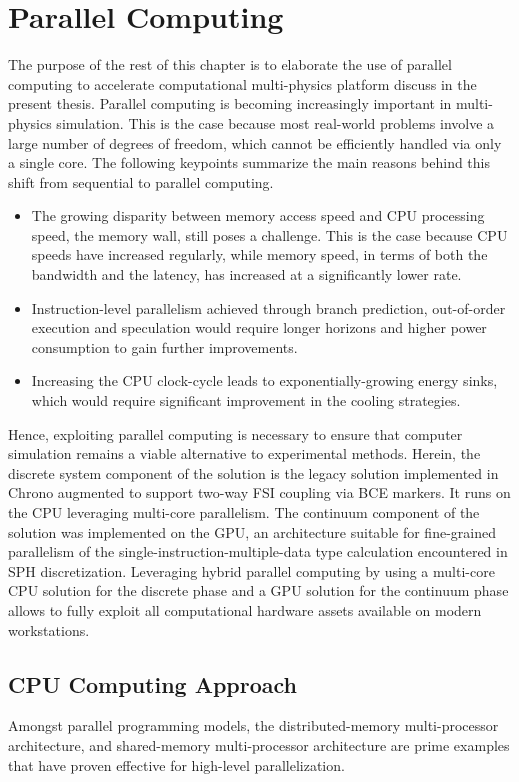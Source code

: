 \section{Parallel Computing}
The purpose of the rest of this chapter is to elaborate the use of parallel computing to accelerate computational multi-physics platform discuss in the present thesis.  Parallel computing is becoming increasingly important in multi-physics simulation. This is the case because most  real-world problems involve a large number of degrees of freedom, which cannot be efficiently handled via only a single core. The following keypoints summarize the main reasons behind this shift from sequential to parallel computing. 
\begin{itemize}
	\item The growing disparity between memory access speed and CPU processing speed, the memory wall, still poses a challenge.  This is the case because CPU speeds have increased regularly, while memory speed, in terms of both the bandwidth and the latency, has increased at a significantly lower rate. 
	\item Instruction-level parallelism achieved through branch prediction, out-of-order execution and speculation would require longer horizons and higher power consumption to gain further improvements.
	\item Increasing the CPU clock-cycle leads to exponentially-growing energy sinks, which would require significant improvement in the cooling strategies.
\end{itemize}
Hence, exploiting parallel computing is necessary to ensure that computer simulation remains a viable alternative to experimental methods. Herein, the discrete system component of the solution is the legacy solution implemented in Chrono augmented to support two-way FSI coupling via BCE markers. It runs on the CPU leveraging multi-core parallelism. The continuum component of the solution was implemented on the GPU, an architecture suitable for fine-grained parallelism of the single-instruction-multiple-data type calculation encountered in SPH discretization. Leveraging hybrid parallel computing by using a multi-core CPU solution for the discrete phase and a GPU solution for the continuum phase allows to fully exploit all computational hardware assets available on modern workstations.


\subsection{CPU Computing Approach}
Amongst parallel programming models, the distributed-memory multi-processor architecture, and shared-memory multi-processor architecture are prime examples that have proven effective for high-level parallelization. 

